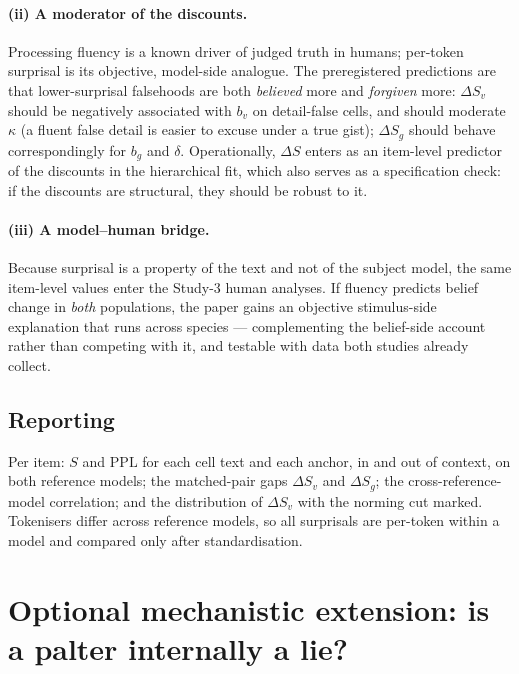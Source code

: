 \documentclass[11pt]{article}
\begin{document}
\paragraph{(ii) A moderator of the discounts.} Processing fluency is a
known driver of judged truth in humans; per-token surprisal is its
objective, model-side analogue. The preregistered predictions are that
lower-surprisal falsehoods are both \emph{believed} more and \emph{forgiven}
more: $\Delta S_v$ should be negatively associated with $b_v$ on
detail-false cells, and should moderate $\kappa$ (a fluent false detail is
easier to excuse under a true gist); $\Delta S_g$ should behave
correspondingly for $b_g$ and $\delta$. Operationally, $\Delta S$ enters
as an item-level predictor of the discounts in the hierarchical fit,
which also serves as a specification check: if the discounts are
structural, they should be robust to it.

\paragraph{(iii) A model--human bridge.} Because surprisal is a property of
the text and not of the subject model, the same item-level values enter the
Study-3 human analyses. If fluency predicts belief change in \emph{both}
populations, the paper gains an objective stimulus-side explanation that
runs across species --- complementing the belief-side account rather than
competing with it, and testable with data both studies already collect.

\subsection{Reporting}

Per item: $S$ and $\mathrm{PPL}$ for each cell text and each anchor, in and
out of context, on both reference models; the matched-pair gaps $\Delta S_v$
and $\Delta S_g$; the cross-reference-model correlation; and the
distribution of $\Delta S_v$ with the norming cut marked. Tokenisers differ
across reference models, so all surprisals are per-token within a model and
compared only after standardisation.

\section{Optional mechanistic extension: is a palter internally a lie?}
\label{sec:probe}
\end{document}
